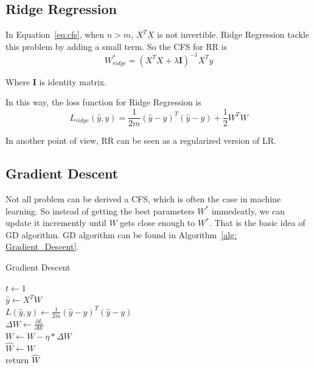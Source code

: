\documentclass[journal, a4paper]{IEEEtran}
\begin{document}
\subsection{Ridge Regression}
In Equation~\ref{eq:cfs}, when $n > m$, $X^{T}X$ is not invertible. Ridge Regression tackle this problem by adding a small term. So the CFS for RR is
\begin{equation}
W_{ridge}^{*} = (X^{T}X + \lambda \mathbf{I})^{-1}X^{T}y
\end{equation} \par
Where $\mathbf{I}$ is identity matrix. \par
In this way, the loss function for Ridge Regression is
\begin{equation}
L_{ridge}(\hat{y}, y) = \frac{1}{2m}(\hat{y} - y)^{T}(\hat{y} - y)  + \frac{1}{2} W^{T} W
\end{equation} \par
In another point of view, RR can be seen as a regularized version of LR.
\subsection{Gradient Descent}
Not all problem can be derived a CFS, which is often the case in machine learning. So instead of getting the best parameters $W^{*}$ immedeatly, we can update it incremently until $W$ gets close enough to $W^{*}$. That is the basic idea of GD algorithm. GD algorithm can be found in Algorithm~\ref{alg: Gradient_Descent}. 
\begin{algorithm}

	\label{alg: Gradient_Descent}
	\caption{Gradient Descent}
	$t \gets 1$ \\
	{
		$\hat{y} \gets X^{T}W $ \\
		$ L(\hat{y}, y) \gets \frac{1}{2m}(\hat{y} - y)^{T}(\hat{y} - y)$ \\
		$\Delta{W} \gets \frac{\partial L}{\partial W}$ \\
		$W \gets W - \eta * \Delta{W}$ \\
	}
	$\hat{W} \gets W$ \\
	return $\hat{W}$
\end{algorithm}
\end{document}
